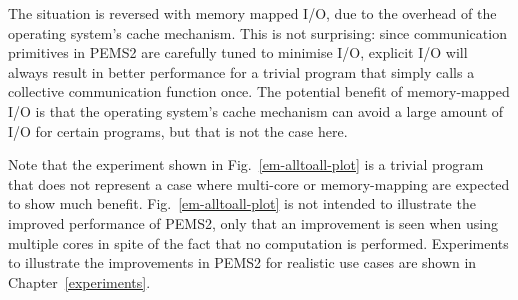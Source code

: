 \documentclass[12pt]{carletoncsthesis}
\begin{document}
The situation is reversed with memory mapped I/O, due to the overhead
of the operating system's cache mechanism.  This is not surprising: since
communication primitives in PEMS2 are carefully tuned to minimise I/O, explicit
I/O will always result in better performance for a trivial program that simply
calls a collective communication function once.  The potential benefit of
memory-mapped I/O is that the operating system's cache mechanism can avoid
a large amount of I/O for certain programs, but that is not the case here.

Note that the experiment shown in Fig.~\ref{em-alltoall-plot} is a trivial
program that does not represent a case where multi-core or memory-mapping are
expected to show much benefit.  Fig.~\ref{em-alltoall-plot} is not intended
to illustrate the improved performance of PEMS2, only that an improvement
is seen when using multiple cores in spite of the fact that no computation
is performed.  Experiments to illustrate the improvements in PEMS2 for
realistic use cases are shown in Chapter~\ref{experiments}.
\end{document}
